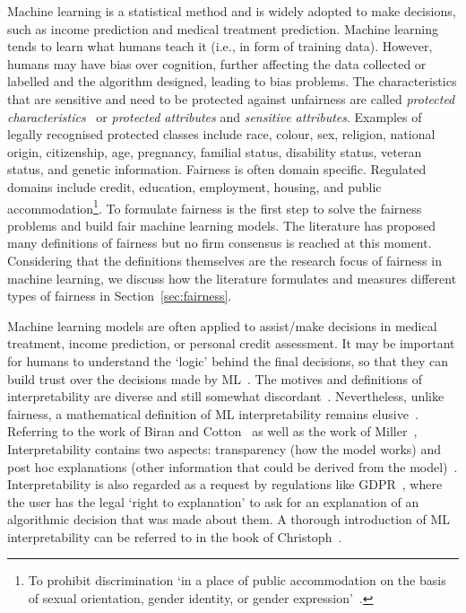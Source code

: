 Machine learning is a statistical method and is widely adopted to make decisions, such as income prediction and medical treatment prediction. 
Machine learning tends to learn what humans teach it (i.e., in form of training data). 
However, humans may have bias over cognition, further affecting the data collected or labelled and the algorithm designed, leading to bias problems. 
The characteristics that are sensitive and need to be protected against unfairness are called \emph{protected characteristics}~ or \emph{protected attributes} and \emph{sensitive attributes}.
Examples of legally recognised protected classes include 
race, colour, sex, religion, national origin, citizenship, age, pregnancy, 
familial status, disability status, veteran status, and genetic information.
Fairness is often domain specific. 
Regulated domains include credit, education, employment, housing, and public accommodation\footnote{To prohibit discrimination `in a place of public accommodation on the basis of sexual orientation, gender identity, or gender expression'~.}.
To formulate fairness is the first step to solve the fairness problems and build fair machine learning models.
The literature has proposed many definitions of fairness but no firm consensus is reached at this moment.
Considering that the definitions themselves are the research focus of fairness in machine learning,
we discuss how the literature formulates and measures different types of fairness in Section~\ref{sec:fairness}.

Machine learning models are often applied to assist/make decisions in medical treatment, income prediction, or personal credit assessment.
It may be important for humans to understand the `logic' behind the final decisions, so that they can build trust over the decisions made by ML~.
The motives and definitions of interpretability are diverse and still somewhat discordant~.
Nevertheless, unlike fairness, a mathematical definition of ML interpretability remains elusive~.
Referring to the work of Biran and Cotton~ as well as the work of Miller~, 
Interpretability contains two aspects: transparency (how the model works) and post hoc explanations (other information that could be derived from the model)~.
Interpretability is also regarded as a request by regulations like GDPR~, where the user has the legal `right to explanation' to ask for an explanation of an algorithmic decision that was made about them.
A thorough introduction of ML interpretability can be referred to in the book of Christoph~.


